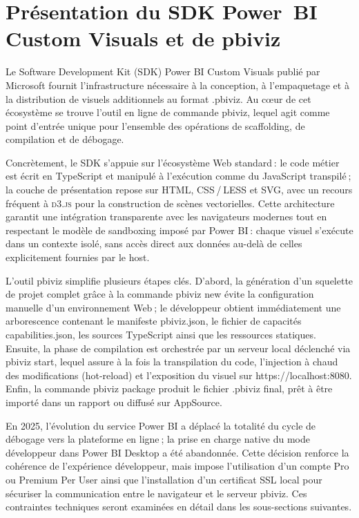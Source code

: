 
\section{Présentation du SDK Power~BI Custom Visuals et de pbiviz}\label{sec:ch4_sdk_pbiviz}

Le Software Development Kit (SDK) Power BI Custom Visuals publié par Microsoft fournit l’infrastructure nécessaire à la conception, à l’empaquetage et à la distribution de visuels additionnels au format .pbiviz. Au cœur de cet écosystème se trouve l’outil en ligne de commande pbiviz, lequel agit comme point d’entrée unique pour l’ensemble des opérations de scaffolding, de compilation et de débogage.

Concrètement, le SDK s’appuie sur l’écosystème Web standard : le code métier est écrit en TypeScript et manipulé à l’exécution comme du JavaScript transpilé ; la couche de présentation repose sur HTML, CSS / LESS et SVG, avec un recours fréquent à \textsc{d3.js} pour la construction de scènes vectorielles. Cette architecture garantit une intégration transparente avec les navigateurs modernes tout en respectant le modèle de sandboxing imposé par Power BI : chaque visuel s’exécute dans un contexte isolé, sans accès direct aux données au-delà de celles explicitement fournies par le host.

L’outil pbiviz simplifie plusieurs étapes clés. D’abord, la génération d’un squelette de projet complet grâce à la commande pbiviz new évite la configuration manuelle d’un environnement Web ; le développeur obtient immédiatement une arborescence contenant le manifeste pbiviz.json, le fichier de capacités capabilities.json, les sources TypeScript ainsi que les ressources statiques. Ensuite, la phase de compilation est orchestrée par un serveur local déclenché via pbiviz start, lequel assure à la fois la transpilation du code, l’injection à chaud des modifications (hot-reload) et l’exposition du visuel sur https://localhost:8080. Enfin, la commande pbiviz package produit le fichier .pbiviz final, prêt à être importé dans un rapport ou diffusé sur AppSource.

En 2025, l’évolution du service Power BI a déplacé la totalité du cycle de débogage vers la plateforme en ligne ; la prise en charge native du mode développeur dans Power BI Desktop a été abandonnée. Cette décision renforce la cohérence de l’expérience développeur, mais impose l’utilisation d’un compte Pro ou Premium Per User ainsi que l’installation d’un certificat SSL local pour sécuriser la communication entre le navigateur et le serveur pbiviz. Ces contraintes techniques seront examinées en détail dans les sous-sections suivantes.

